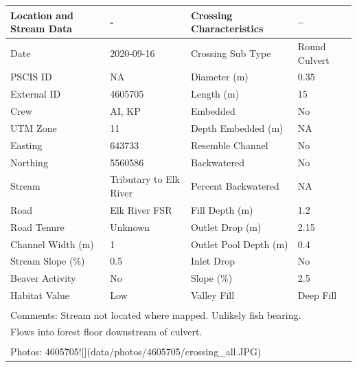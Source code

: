 \documentclass[
]{book}
\begin{document}
\begin{tabular}{l|l|l|l}
\hline
Location and Stream Data & - & Crossing Characteristics & --\\
\hline
Date & 2020-09-16 & Crossing Sub Type & Round Culvert\\
\hline
PSCIS ID & NA & Diameter (m) & 0.35\\
\hline
External ID & 4605705 & Length (m) & 15\\
\hline
Crew & AI, KP & Embedded & No\\
\hline
UTM Zone & 11 & Depth Embedded (m) & NA\\
\hline
Easting & 643733 & Resemble Channel & No\\
\hline
Northing & 5560586 & Backwatered & No\\
\hline
Stream & Tributary to Elk River & Percent Backwatered & NA\\
\hline
Road & Elk River FSR & Fill Depth (m) & 1.2\\
\hline
Road Tenure & Unknown & Outlet Drop (m) & 2.15\\
\hline
Channel Width (m) & 1 & Outlet Pool Depth (m) & 0.4\\
\hline
Stream Slope (\%) & 0.5 & Inlet Drop & No\\
\hline
Beaver Activity & No & Slope (\%) & 2.5\\
\hline
Habitat Value & Low & Valley Fill & Deep Fill\\
\hline
\multicolumn{4}{l}{\textsuperscript{} Comments: Stream not located where mapped. Unlikely fish bearing.}\\
\multicolumn{4}{l}{Flows into forest floor downstream of culvert.}\\
\multicolumn{4}{l}{\textsuperscript{} Photos: 4605705![](data/photos/4605705/crossing\_all.JPG)}\\
\end{tabular}
\end{document}

